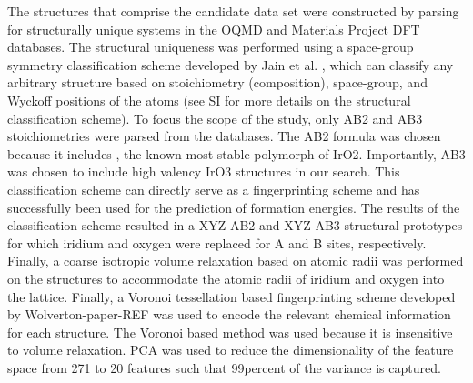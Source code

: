 

The structures that comprise the candidate data set were constructed by parsing for structurally unique systems in the OQMD and Materials Project DFT databases.
The structural uniqueness was performed using a space-group symmetry classification scheme developed by Jain et al. \cite{Jain2018}, which can classify any arbitrary structure based on stoichiometry (composition), space-group, and Wyckoff positions of the atoms
%
 (see SI for more details on the structural classification scheme).
%
%
To focus the scope of the study, only AB2 and AB3 stoichiometries were parsed from the databases.
%
The AB2 formula was chosen because it includes \rIrOtwo, the known most stable polymorph of IrO2.
%
Importantly, AB3 was chosen to include high valency IrO3 structures in our search.
This classification scheme can directly serve as a fingerprinting scheme and has successfully been used for the prediction of formation energies.  %
%
The results of the classification scheme resulted in a XYZ AB2 and XYZ AB3 structural prototypes for which iridium and oxygen were replaced for A and B sites, respectively.
%
Finally, a coarse isotropic volume relaxation based on atomic radii was performed on the structures to accommodate the atomic radii of iridium and oxygen into the lattice.
Finally, a Voronoi tessellation based fingerprinting scheme developed by Wolverton-paper-REF was used to encode the relevant chemical information for each structure.
%
%
The Voronoi based method was used because it is insensitive to volume relaxation.
PCA was used to reduce the dimensionality of the feature space from 271  to 20 features such that 99percent of the variance is captured.
%
%


